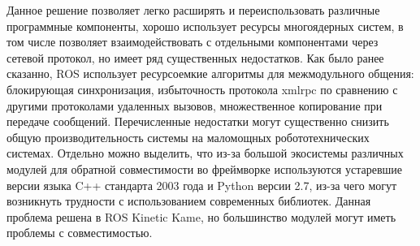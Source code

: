 Данное решение позволяет легко расширять и переиспользовать различные программные компоненты, хорошо использует ресурсы многоядерных систем, в том числе позволяет взаимодействовать с отдельными компонентами через сетевой протокол, но имеет ряд существенных недостатков. Как было ранее сказанно, ROS использует ресурсоемкие алгоритмы для межмодульного общения: блокирующая синхронизация, избыточность протокола xmlrpc по сравнению с другими протоколами удаленных вызовов, множественное копирование при передаче сообщений. Перечисленные недостатки могут существенно снизить общую производительность системы на маломощных робототехнических системах. Отдельно можно выделить, что из-за большой экосистемы различных модулей для обратной совместимости во фреймворке используются устаревшие версии языка C++ стандарта 2003 года и Python версии 2.7, из-за чего могут возникнуть трудности с использованием современных библиотек. Данная проблема решена в ROS Kinetic Kame, но большинство модулей могут иметь проблемы с совместимостью.


